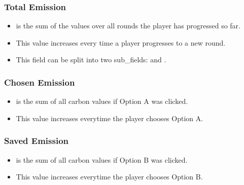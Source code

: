 \documentclass[letterpaper,10pt,english]{sphinxmanual}
\begin{document}
\subsubsection{Total Emission}
\label{\detokenize{Player_fields:total-emission}}\begin{itemize}
\item {} 
 is the sum of the  values over all rounds the player has progressed so far.

\item {} 
This value increases every time a player progresses to a new round.

\item {} 
This field can be split into two sub\_fields:  and .

\end{itemize}


\subsubsection{Chosen Emission}
\label{\detokenize{Player_fields:chosen-emission}}\begin{itemize}
\item {} 
 is the sum of all carbon values if Option A was clicked.

\item {} 
This value increases everytime the player chooses Option A.

\end{itemize}


\subsubsection{Saved Emission}
\label{\detokenize{Player_fields:saved-emission}}\begin{itemize}
\item {} 
 is the sum of all carbon values if Option B was clicked.

\item {} 
This value increases everytime the player chooses Option B.

\end{itemize}
\end{document}
